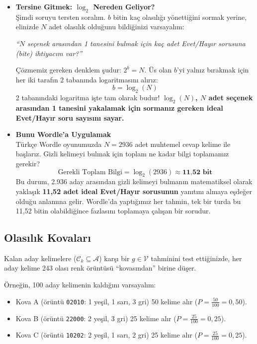 \documentclass[11pt,a4paper]{article}
\begin{document}
\begin{itemize}[leftmargin=1.5em, itemsep=12pt]
    \item \textbf{Tersine Gitmek: $\log_2$ Nereden Geliyor?} \\
    Şimdi soruyu tersten soralım. $b$ bitin kaç olasılığı yönettiğini sormak yerine, elinizde $N$ adet olasılık olduğunu bildiğinizi varsayalım:
    \begin{center}
    \textit{``$N$ seçenek arasından 1 tanesini bulmak için kaç adet Evet/Hayır sorusuna (bite) ihtiyacım var?''}
    \end{center}
    Çözmemiz gereken denklem şudur: $2^b = N$. Üs olan $b$'yi yalnız bırakmak için her iki tarafın 2 tabanında logaritmasını alırız:
    \begin{equation}
    b = \log_2(N)
    \end{equation}
    2 tabanındaki logaritma işte tam olarak budur! \textbf{$\log_2(N)$, $N$ adet seçenek arasından 1 tanesini yakalamak için sormanız gereken ideal Evet/Hayır soru sayısını sayar.}

    \item \textbf{Bunu Wordle'a Uygulamak} \\
    Türkçe Wordle oyunumuzda $N = 2936$ adet muhtemel cevap kelime ile başlarız. Gizli kelimeyi bulmak için toplam ne kadar bilgi toplamamız gerekir?
    \begin{equation}
    \text{Gerekli Toplam Bilgi} = \log_2(2936) \approx \textbf{11,52 bit}
    \end{equation}
    Bu durum, 2.936 aday arasından gizli kelimeyi bulmanın matematiksel olarak yaklaşık \textbf{11,52 adet ideal Evet/Hayır sorusunun} yanıtını almaya eşdeğer olduğu anlamına gelir. Wordle'da yaptığımız her tahmin, tek bir turda bu 11,52 bitin olabildiğince fazlasını toplamaya çalışan bir sorudur.
\end{itemize}

\subsection{Olasılık Kovaları}
Kalan aday kelimelere ($\mathcal{C}_k \subseteq \mathcal{A}$) karşı bir $g \in \mathcal{V}$ tahminini test ettiğinizde, her aday kelime 243 olası renk örüntüsü ``kovasından'' birine düşer.

Örneğin, 100 aday kelimenin kaldığını varsayalım:
\begin{itemize}[itemsep=2pt]
    \item Kova A (örüntü \texttt{02010}: 1 yeşil, 1 sarı, 3 gri) 50 kelime alır ($P = \frac{50}{100} = 0,50$).
    \item Kova B (örüntü \texttt{22000}: 2 yeşil, 3 gri) 25 kelime alır ($P = \frac{25}{100} = 0,25$).
    \item Kova C (örüntü \texttt{10202}: 2 yeşil, 1 sarı, 2 gri) 25 kelime alır ($P = \frac{25}{100} = 0,25$).
\end{itemize}
\end{document}
